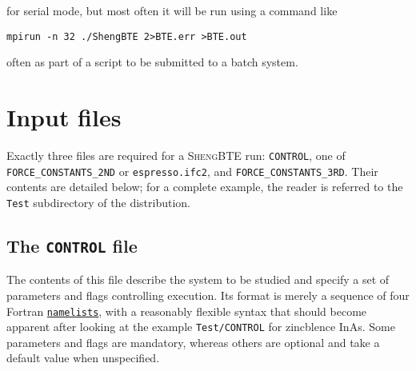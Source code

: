 \documentclass[a4paper,10pt,english]{article}
\begin{document}
\noindent for serial mode, but most often it will be run using a command like

\begin{verbatim}
mpirun -n 32 ./ShengBTE 2>BTE.err >BTE.out
\end{verbatim}

\noindent often as part of a script to be submitted to a batch system.

\section{Input files}

Exactly three files are required for a \textsc{ShengBTE} run: \texttt{CONTROL}, one of \texttt{FORCE\_CONSTANTS\_2ND} or \texttt{espresso.ifc2}, and \texttt{FORCE\_CONSTANTS\_3RD}. Their contents are detailed below; for a complete example, the reader is referred to the \texttt{Test} subdirectory of the distribution.

\subsection{The \texttt{CONTROL} file}

The contents of this file describe the system to be studied and specify a set of parameters and flags controlling execution. Its format is merely a sequence of four Fortran \href{http://publib.boulder.ibm.com/infocenter/lnxpcomp/v8v101/index.jsp?topic=%2Fcom.ibm.xlf101l.doc%2Fxlflr%2Fnamelistio.htm}{\nolinkurl{namelists}}, with a reasonably flexible syntax that should become apparent after looking at the example \texttt{Test/CONTROL} for zincblence InAs. Some parameters and flags are mandatory, whereas others are optional and take a default value when unspecified.
\end{document}
